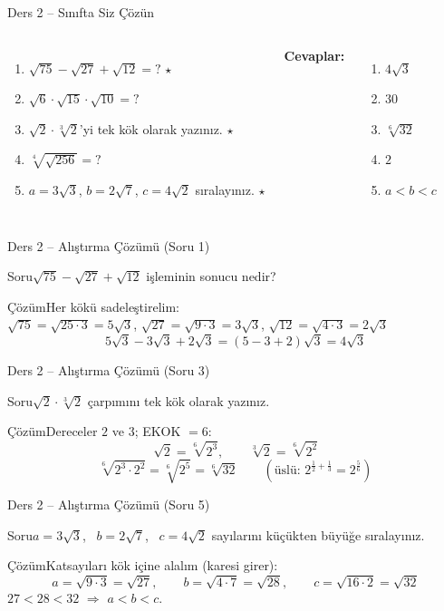 \documentclass[aspectratio=169,11pt]{beamer}
\newcommand{\soru}[3]{%
\begin{frame}{#1}
  \begin{block}{Soru}\large #2\end{block}
  \pause
  \begin{exampleblock}{Çözüm}\large #3\end{exampleblock}
\end{frame}}
\begin{document}
\begin{frame}{Ders 2 -- Sınıfta Siz Çözün}
\begin{columns}[t]
\begin{enumerate}
\item \(\sqrt{75}-\sqrt{27}+\sqrt{12}=?\) \(\star\)
\item \(\sqrt6\cdot\sqrt{15}\cdot\sqrt{10}=?\)
\item \(\sqrt2\cdot\sqrt[3]{2}\)'yi tek kök olarak yazınız. \(\star\)
\item \(\sqrt[4]{\sqrt{256}}=?\)
\item \(a=3\sqrt3\), \(b=2\sqrt7\), \(c=4\sqrt2\) sıralayınız. \(\star\)
\end{enumerate}
\pause
\textbf{Cevaplar:}
\begin{enumerate}
\item \(4\sqrt3\)
\item \(30\)
\item \(\sqrt[6]{32}\)
\item \(2\)
\item \(a<b<c\)
\end{enumerate}
\end{columns}
\vspace{4pt}{\footnotesize \(\star\) işaretli soruların adım adım çözümü sonraki slaytlardadır.}
\end{frame}

\soru{Ders 2 -- Alıştırma Çözümü (Soru 1)}
{\(\sqrt{75}-\sqrt{27}+\sqrt{12}\) işleminin sonucu nedir?}
{Her kökü sadeleştirelim:\\[3pt]
\(\sqrt{75}=\sqrt{25\cdot 3}=5\sqrt3\), \quad \(\sqrt{27}=\sqrt{9\cdot 3}=3\sqrt3\), \quad \(\sqrt{12}=\sqrt{4\cdot 3}=2\sqrt3\)
\[5\sqrt3-3\sqrt3+2\sqrt3=(5-3+2)\sqrt3=4\sqrt3\]}

\soru{Ders 2 -- Alıştırma Çözümü (Soru 3)}
{\(\sqrt2\cdot\sqrt[3]{2}\) çarpımını tek kök olarak yazınız.}
{Dereceler \(2\) ve \(3\); EKOK \(=6\):
\[\sqrt2=\sqrt[6]{2^3},\qquad \sqrt[3]{2}=\sqrt[6]{2^2}\]
\[\sqrt[6]{2^3\cdot 2^2}=\sqrt[6]{2^5}=\sqrt[6]{32}\qquad(\text{üslü: } 2^{\frac12+\frac13}=2^{\frac56})\]}

\soru{Ders 2 -- Alıştırma Çözümü (Soru 5)}
{\(a=3\sqrt3\), \ \(b=2\sqrt7\), \ \(c=4\sqrt2\) sayılarını küçükten büyüğe sıralayınız.}
{Katsayıları kök içine alalım (karesi girer):
\[a=\sqrt{9\cdot 3}=\sqrt{27},\qquad b=\sqrt{4\cdot 7}=\sqrt{28},\qquad c=\sqrt{16\cdot 2}=\sqrt{32}\]
\(27<28<32\) \(\Rightarrow\) \(a<b<c\).}
\end{document}
